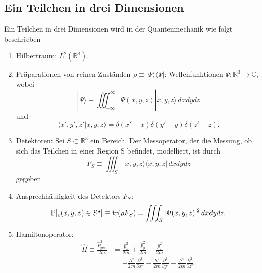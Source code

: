 \subsection{Ein Teilchen in drei Dimensionen}
Ein Teilchen in drei Dimensionen wird in der Quantenmechanik wie folgt beschrieben
\begin{enumerate}
	\item Hilbertraum: $L^2(\mathbb{R}^3)$.
	\item Präparationen von reinen Zuständen $\rho \equiv |\Psi\rangle\langle\Psi|$: Wellenfunktionen $\Psi:\mathbb{R}^3\rightarrow \mathbb{C}$, wobei
	\begin{equation}
		|\Psi\rangle \equiv \iiint_{-\infty}^\infty \Psi(x,y,z) |x,y,z\rangle \, dxdydz
	\end{equation}
	und
	\begin{equation}
		\langle x',y',z'|x,y,z\rangle = \delta(x'-x)\delta(y'-y)\delta(z'-z).
	\end{equation}
	\item Detektoren: Sei $S\subset \mathbb{R}^3$ ein Bereich. Der Messoperator, der die Messung, ob sich das Teilchen in einer Region S befindet, modelliert, ist durch 
	\begin{equation}
		F_{S} \equiv \iiint_S  	|x,y,z\rangle \langle x,y,z|\, dxdydz
	\end{equation} 
	gegeben.
	\item Ansprechhäufigkeit des Detektors $F_S$: 
	\begin{equation}
		\mathbb{P}[\text{,,$(x,y,z)\in S$``}] \equiv \operatorname{tr}(\rho F_S) = \iiint_S |\Psi(x,y,z)|^2 \, dxdydz.
	\end{equation}
	\item Hamiltonoperator:
	\begin{equation}
		\begin{split}
			\widehat{H} \equiv \frac{\widehat{P}^2_{\text{ges.}}}{2m} &= \frac{\widehat{p}_x^2}{2m}+\frac{\widehat{p}_y^2}{2m}+\frac{\widehat{p}_z^2}{2m} \\ &= -\frac{\hbar^2}{2m}\frac{\partial^2}{\partial x^2}-\frac{\hbar^2}{2m}\frac{\partial^2}{\partial y^2}-\frac{\hbar^2}{2m}\frac{\partial^2}{\partial z^2}.
		\end{split}
	\end{equation}
\end{enumerate}


